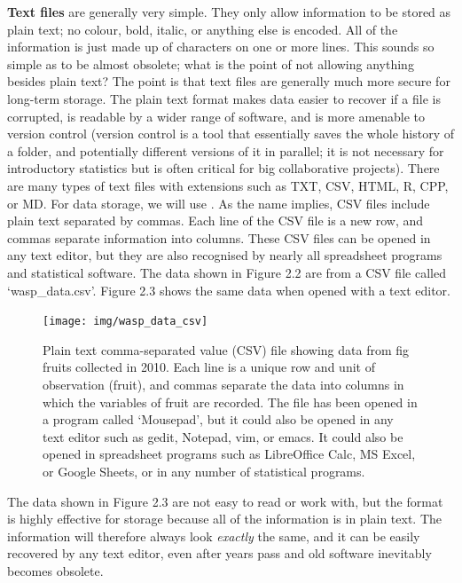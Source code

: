 \documentclass[
  openany]{krantz}
\begin{document}
\textbf{Text files} are generally very simple.
They only allow information to be stored as plain text; no colour, bold, italic, or anything else is encoded.
All of the information is just made up of characters on one or more lines.
This sounds so simple as to be almost obsolete; what is the point of not allowing anything besides plain text?
The point is that text files are generally much more secure for long-term storage.
The plain text format makes data easier to recover if a file is corrupted, is readable by a wider range of software, and is more amenable to version control (version control is a tool that essentially saves the whole history of a folder, and potentially different versions of it in parallel; it is not necessary for introductory statistics but is often critical for big collaborative projects).
There are many types of text files with extensions such as TXT, CSV, HTML, R, CPP, or MD.
For data storage, we will use .
As the name implies, CSV files include plain text separated by commas.
Each line of the CSV file is a new row, and commas separate information into columns.
These CSV files can be opened in any text editor, but they are also recognised by nearly all spreadsheet programs and statistical software.
The data shown in Figure 2.2 are from a CSV file called `wasp\_data.csv'.
Figure 2.3 shows the same data when opened with a text editor.

\begin{figure}
\texttt{[image: img/wasp\_data\_csv]} \caption{Plain text comma-separated value (CSV) file showing data from fig fruits collected in 2010. Each line is a unique row and unit of observation (fruit), and commas separate the data into columns in which the variables of fruit are recorded. The file has been opened in a program called `Mousepad', but it could also be opened in any text editor such as gedit, Notepad, vim, or emacs. It could also be opened in spreadsheet programs such as LibreOffice Calc, MS Excel, or Google Sheets, or in any number of statistical programs.}\label{fig:unnamed-chunk-6}
\end{figure}

The data shown in Figure 2.3 are not easy to read or work with, but the format is highly effective for storage because all of the information is in plain text.
The information will therefore always look \emph{exactly} the same, and it can be easily recovered by any text editor, even after years pass and old software inevitably becomes obsolete.
\end{document}
